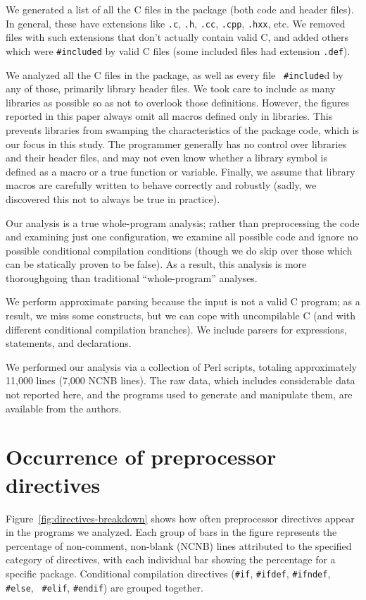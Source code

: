 \documentclass[10pt]{article}
\newcommand{\file}[1]{\texttt{#1}}
\begin{document}
We generated a list of all the C files in the package (both code and header
files).  In general, these have extensions like \file{.c}, \file{.h},
\file{.cc}, \file{.cpp}, \file{.hxx}, etc.  We removed files with such
extensions that don't actually contain valid C, and added others which were
{\tt \#included} by valid C files (some included files had extension
\file{.def}).

We analyzed all the C files in the package, as well as every file {\tt
\#include}d by any of those, primarily library header files.  We
took care to include as many libraries as possible so as not to overlook
those definitions.  However, the figures reported in this paper always omit
all macros defined only in libraries.  This prevents libraries from
swamping the characteristics of the package code, which is our focus in
this study.  The programmer generally has no control over libraries and
their header files, and may not even know whether a library symbol is
defined as a macro or a true function or variable.  Finally, we assume that
library macros are carefully written to behave correctly and robustly
(sadly, we discovered this not to always be true in practice).

Our analysis is a true whole-program analysis; rather than preprocessing the
code and examining just one configuration, we examine all possible code and
ignore no possible  conditional compilation conditions (though we do skip
over those which can be statically proven to be false).   As a result, this
analysis is more thoroughgoing than traditional ``whole-program'' analyses.

We perform approximate parsing because the input is not a valid C program;
as a result, we miss some constructs, but we can cope with uncompilable C
(and with different conditional compilation branches).  We include parsers
for expressions, statements, and declarations.

We performed our analysis via a collection of Perl scripts, totaling
approximately 11,000 lines (7,000 NCNB lines).  The raw data, which
includes considerable data not reported here, and the programs used to
generate and manipulate them, are available from the authors.



\section{Occurrence of preprocessor directives}
\label{sec:directives}

Figure~\ref{fig:directives-breakdown} shows how often preprocessor
directives appear in the programs we analyzed.  Each group of bars in the
figure represents the percentage of non-comment, non-blank (NCNB) lines
attributed to the specified category of directives, with each individual
bar showing the percentage for a specific package.  Conditional compilation
directives ({\tt \#if}, {\tt \#ifdef}, {\tt \#ifndef}, {\tt \#else}, {\tt
\#elif}, {\tt \#endif}) are grouped together.
\end{document}
